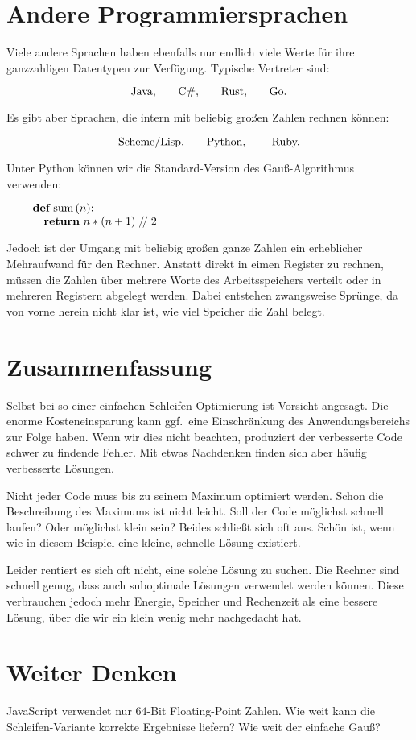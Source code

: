 \section{Andere Programmiersprachen}%
%
Viele andere Sprachen haben ebenfalls nur endlich viele Werte für ihre
ganzzahligen Datentypen zur Verfügung.
Typische Vertreter sind:

$$\hbox{Java,\qquad C\#,\qquad Rust,\qquad Go.}$$

\noindent Es gibt aber Sprachen, die intern mit beliebig großen
Zahlen rechnen können:

$$\hbox{Scheme/Lisp,\qquad Python, \qquad Ruby.}$$

\noindent Unter Python können wir die Standard-Version des Gauß-Algorithmus verwenden:

$$\vbox{\obeylines
{\bf def} sum$\,$($n$):
\quad {\bf return} $n * (n + 1) \mathrel{/\!/} 2$
}$$

\noindent Jedoch ist der Umgang mit beliebig großen ganze Zahlen
ein erheblicher Mehraufwand für den Rechner.
Anstatt direkt in eimen Register zu rechnen, müssen die
Zahlen über mehrere Worte des Arbeitsspeichers verteilt
oder in mehreren Registern abgelegt werden.
Dabei entstehen zwangsweise Sprünge, da von vorne herein
nicht klar ist, wie viel Speicher die Zahl belegt.

\section{Zusammenfassung}%
%
Selbst bei so einer einfachen Schleifen-Optimierung ist
Vorsicht angesagt.
Die enorme Kosteneinsparung kann ggf.\ eine Einschränkung
des Anwendungsbereichs zur Folge haben.
Wenn wir dies nicht beachten, produziert der verbesserte
Code schwer zu findende Fehler.
Mit etwas Nachdenken finden sich aber häufig verbesserte
Lösungen.

Nicht jeder Code muss bis zu seinem Maximum optimiert
werden.
Schon die Beschreibung des Maximums ist nicht leicht.
Soll der Code möglichst schnell laufen?
Oder möglichst klein sein?
Beides schließt sich oft aus.
Schön ist, wenn wie in diesem Beispiel eine kleine,
schnelle Lösung existiert.

Leider rentiert es sich oft nicht, eine solche Lösung
zu suchen.
Die Rechner sind schnell genug, dass auch suboptimale
Lösungen verwendet werden können.
Diese verbrauchen jedoch mehr Energie, Speicher und
Rechenzeit als eine bessere Lösung, über die wir ein
klein wenig mehr nachgedacht hat.

\section{Weiter Denken}%
%
\def\aufg{\bigskip{}\qquad}
\aufg JavaScript verwendet nur $64$-Bit Floating-Point Zahlen.
Wie weit kann die Schleifen-Variante korrekte Ergebnisse
liefern? Wie weit der einfache Gauß?

